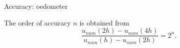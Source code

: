 \documentclass[mathserif,professionalfont,hyperref={pdfpagelabels=false}]{beamer}
\begin{document}
\begin{frame}{Accuracy: oedometer}
  \begin{minipage}{\linewidth}
      \centering
      \begin{minipage}{0.42\linewidth}
	\begin{tcolorbox}[colback=red!5,colframe=red!50!black,title=Richardson's extrapolation]
	\small{The order of accuracy $n$ is obtained from $$\frac{u_{num}(2h)-u_{num}(4h)}{u_{num}(h)-u_{num}(2h)} = 2^{n}.$$}
	\end{tcolorbox}
      \end{minipage}
    \hspace{0.01\linewidth}
      \begin{minipage}{0.48\linewidth}
      \: \:
      \:
      \:
      \:
      \: 
            \: \:
      \:
      \:
      \:
      \:
                  \: \:



\end{minipage}
\end{minipage}
\end{frame}
\end{document}
